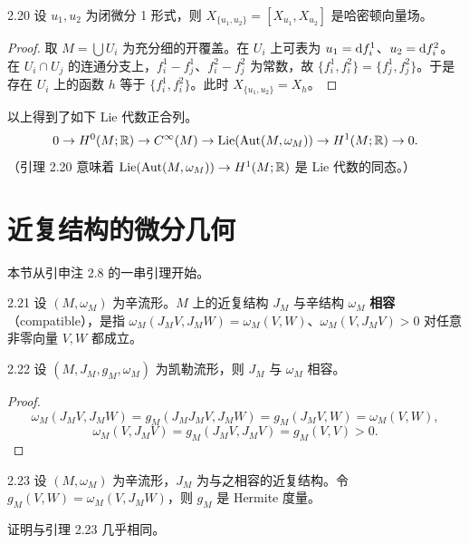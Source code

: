 \begin{lemma*}{2.20}
  设 $u_1,u_2$ 为闭微分 1 形式，则 $X_{\{u_1,u_2\}}=[X_{u_1},X_{u_2}]$ 是哈密顿向量场。
\end{lemma*}

\begin{proof}
  取 $M=\bigcup U_i$ 为充分细的开覆盖。在 $U_i$ 上可表为 $u_1=\mathrm{d} f_i^1$、$u_2=\mathrm{d} f_i^2$。在 $U_i\cap U_j$ 的连通分支上，$f_i^1-f_j^1$、$f_i^2-f_j^2$ 为常数，故 $\{f_i^1,f_i^2\}=\{f_j^1,f_j^2\}$。于是存在 $U_i$ 上的函数 $h$ 等于 $\{f_i^1,f_i^2\}$。此时 $X_{\{u_1,u_2\}}=X_h$。
\end{proof}

以上得到了如下 Lie 代数正合列。
\[
  0\to H^0(M;\mathbb{R})\to C^\infty(M)\to\operatorname{Lie}(\operatorname{Aut}(M,\omega_M))\to H^1(M;\mathbb{R})\to 0.
\]
（引理 2.20 意味着 $\operatorname{Lie}(\operatorname{Aut}(M,\omega_M))\to H^1(M;\mathbb{R})$ 是 Lie 代数的同态。）

\section{近复结构的微分几何}


本节从引申注 2.8 的一串引理开始。

\begin{definition}{2.21}
  设 $(M,\omega_M)$ 为辛流形。$M$ 上的近复结构 $J_M$ 与辛结构 $\omega_M$ \textbf{相容}（compatible），是指 $\omega_M(J_MV,J_MW)=\omega_M(V,W)$、$\omega_M(V,J_MV)>0$ 对任意非零向量 $V,W$ 都成立。
\end{definition}

\begin{lemma*}{2.22}
  设 $(M,J_M,g_M,\omega_M)$ 为凯勒流形，则 $J_M$ 与 $\omega_M$ 相容。
\end{lemma*}

\begin{proof}
  \[
    \omega_M(J_MV,J_MW)=g_M(J_MJ_MV,J_MW)=g_M(J_MV,W)=\omega_M(V,W),
  \]
  \[
    \omega_M(V,J_MV)=g_M(J_MV,J_MV)=g_M(V,V)>0.
  \]
\end{proof}

\begin{lemma}{2.23}
  设 $(M,\omega_M)$ 为辛流形，$J_M$ 为与之相容的近复结构。令 $g_M(V,W)=\omega_M(V,J_MW)$，则 $g_M$ 是 Hermite 度量。
\end{lemma}

证明与引理 2.23 几乎相同。

